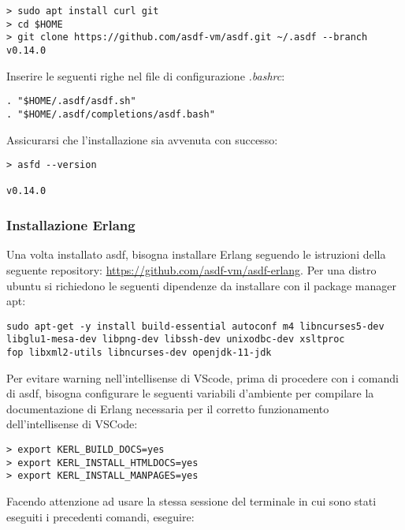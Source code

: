\begin{lstlisting}[language=none]
> sudo apt install curl git
> cd $HOME
> git clone https://github.com/asdf-vm/asdf.git ~/.asdf --branch v0.14.0
\end{lstlisting}

Inserire le seguenti righe nel file di configurazione \textit{.bashrc}:

\begin{lstlisting}[language=none]
. "$HOME/.asdf/asdf.sh"
. "$HOME/.asdf/completions/asdf.bash"
\end{lstlisting}

Assicurarsi che l'installazione sia avvenuta con successo:

\begin{lstlisting}[language=none]
> asfd --version

v0.14.0
\end{lstlisting}

\subsubsection{Installazione Erlang}

Una volta installato asdf, bisogna installare Erlang
seguendo le istruzioni della seguente repository: \url{https://github.com/asdf-vm/asdf-erlang}.
Per una distro ubuntu si richiedono le seguenti dipendenze da installare con
il package manager apt:
\begin{lstlisting}[language=none]
sudo apt-get -y install build-essential autoconf m4 libncurses5-dev
libglu1-mesa-dev libpng-dev libssh-dev unixodbc-dev xsltproc
fop libxml2-utils libncurses-dev openjdk-11-jdk
\end{lstlisting}

Per evitare warning nell'intellisense di VScode, prima di procedere con i
comandi di asdf, bisogna configurare
le seguenti variabili d'ambiente per compilare la documentazione di Erlang
necessaria per il corretto funzionamento dell'intellisense di VSCode:

\begin{lstlisting}[language=none]
> export KERL_BUILD_DOCS=yes
> export KERL_INSTALL_HTMLDOCS=yes
> export KERL_INSTALL_MANPAGES=yes
\end{lstlisting}

Facendo attenzione ad usare la stessa sessione del terminale in cui sono
stati eseguiti i precedenti comandi, eseguire:

